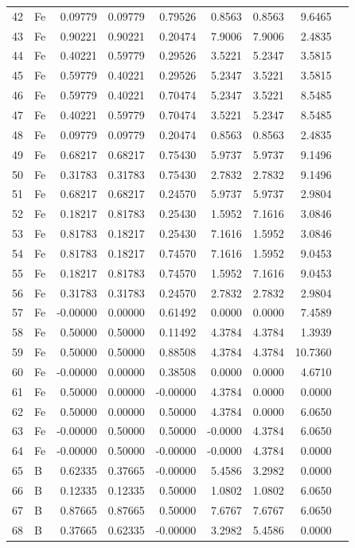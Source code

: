 \begin{longtable}{rlrrrrrrl}
42 & Fe & 0.09779 & 0.09779 & 0.79526 & 0.8563 & 0.8563 & 9.6465 &  \\
43 & Fe & 0.90221 & 0.90221 & 0.20474 & 7.9006 & 7.9006 & 2.4835 &  \\
44 & Fe & 0.40221 & 0.59779 & 0.29526 & 3.5221 & 5.2347 & 3.5815 &  \\
45 & Fe & 0.59779 & 0.40221 & 0.29526 & 5.2347 & 3.5221 & 3.5815 &  \\
46 & Fe & 0.59779 & 0.40221 & 0.70474 & 5.2347 & 3.5221 & 8.5485 &  \\
47 & Fe & 0.40221 & 0.59779 & 0.70474 & 3.5221 & 5.2347 & 8.5485 &  \\
48 & Fe & 0.09779 & 0.09779 & 0.20474 & 0.8563 & 0.8563 & 2.4835 &  \\
49 & Fe & 0.68217 & 0.68217 & 0.75430 & 5.9737 & 5.9737 & 9.1496 &  \\
50 & Fe & 0.31783 & 0.31783 & 0.75430 & 2.7832 & 2.7832 & 9.1496 &  \\
51 & Fe & 0.68217 & 0.68217 & 0.24570 & 5.9737 & 5.9737 & 2.9804 &  \\
52 & Fe & 0.18217 & 0.81783 & 0.25430 & 1.5952 & 7.1616 & 3.0846 &  \\
53 & Fe & 0.81783 & 0.18217 & 0.25430 & 7.1616 & 1.5952 & 3.0846 &  \\
54 & Fe & 0.81783 & 0.18217 & 0.74570 & 7.1616 & 1.5952 & 9.0453 &  \\
55 & Fe & 0.18217 & 0.81783 & 0.74570 & 1.5952 & 7.1616 & 9.0453 &  \\
56 & Fe & 0.31783 & 0.31783 & 0.24570 & 2.7832 & 2.7832 & 2.9804 &  \\
57 & Fe & -0.00000 & 0.00000 & 0.61492 & 0.0000 & 0.0000 & 7.4589 &  \\
58 & Fe & 0.50000 & 0.50000 & 0.11492 & 4.3784 & 4.3784 & 1.3939 &  \\
59 & Fe & 0.50000 & 0.50000 & 0.88508 & 4.3784 & 4.3784 & 10.7360 &  \\
60 & Fe & -0.00000 & 0.00000 & 0.38508 & 0.0000 & 0.0000 & 4.6710 &  \\
61 & Fe & 0.50000 & 0.00000 & -0.00000 & 4.3784 & 0.0000 & 0.0000 &  \\
62 & Fe & 0.50000 & 0.00000 & 0.50000 & 4.3784 & 0.0000 & 6.0650 &  \\
63 & Fe & -0.00000 & 0.50000 & 0.50000 & -0.0000 & 4.3784 & 6.0650 &  \\
64 & Fe & -0.00000 & 0.50000 & -0.00000 & -0.0000 & 4.3784 & 0.0000 &  \\
65 & B & 0.62335 & 0.37665 & -0.00000 & 5.4586 & 3.2982 & 0.0000 &  \\
66 & B & 0.12335 & 0.12335 & 0.50000 & 1.0802 & 1.0802 & 6.0650 &  \\
67 & B & 0.87665 & 0.87665 & 0.50000 & 7.6767 & 7.6767 & 6.0650 &  \\
68 & B & 0.37665 & 0.62335 & -0.00000 & 3.2982 & 5.4586 & 0.0000 &  \\
\bottomrule
\end{longtable}

